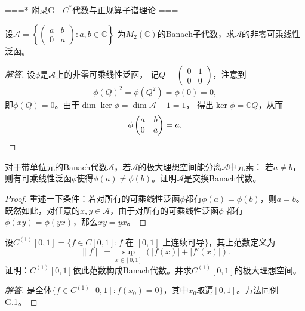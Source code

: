 ===* 附录G\ \ $C^*$代数与正规算子谱理论 ===
\begin{1}
    设$\mathcal{A}=\left\{\begin{pmatrix}a&b\\0&a\end{pmatrix}:a,b\in\mathbb{C}\right\}$
    为$M_2(\mathbb{C})$的Banach子代数，求$\mathcal{A}$的非零可乘线性泛函。
\end{1}
\begin{proof}[解答]
    设$\phi$是$\mathcal{A}$上的非零可乘线性泛函，
    记$Q=\begin{pmatrix}0&1\\0&0\end{pmatrix}$，注意到
    \[\phi(Q)^2=\phi(Q^2)=\phi(0)=0,\]
    即$\phi(Q)=0$。由于$\dim\ker\phi=\dim\mathcal{A}-1=1$，
    得出$\ker\phi=\mathbb{C}Q$，从而
    \[\phi\begin{pmatrix}a&b\\0&a\end{pmatrix}=a.\qedhere\]
\end{proof}
\begin{2}
    对于带单位元的Banach代数$\mathcal{A}$，若$\mathcal{A}$的极大理想空间能分离$\mathcal{A}$中元素：
    若$a \ne b$，则有可乘线性泛函$\phi$使得$\phi(a)\ne\phi(b)$。证明$\mathcal{A}$是交换Banach代数。
\end{2}
\begin{proof}
    重述一下条件：若对所有的可乘线性泛函$\phi$都有$\phi(a)=\phi(b)$，则$a=b$。
    既然如此，对任意的$x,y\in\mathcal{A}$，由于对所有的可乘线性泛函$\phi$
    都有$\phi(xy)=\phi(yx)$，那么$xy=yx$。
\end{proof}
\begin{3}
    设$C^{(1)}[0,1]=\{f \in C[0,1]:f\text{ 在 }[0,1]\text { 上连续可导}\}$，其上范数定义为
    \[\|f\|=\sup_{x\in[0,1]}(|f(x)|+|f'(x)|).\]
    证明：$C^{(1)}[0,1]$依此范数构成Banach代数。并求$C^{(1)}[0,1]$的极大理想空间。
\end{3}
\begin{proof}[解答]
    是全体$\{f \in C^{(1)}[0,1]:f(x_0)=0\}$，其中$x_0$取遍$[0,1]$。方法同例G.1。
\end{proof}
